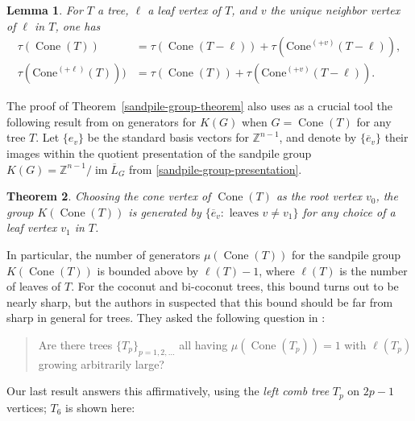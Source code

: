 \documentclass[10pt,reqno]{amsart}
\newcommand{\Z}{\mathbb{Z}}
\DeclareMathOperator{\Cone}{Cone}
\DeclareMathOperator{\im}{im}
\newcommand{\Coneplus}[1]{\mathrm{Cone}^{(+#1)}}
\newtheorem{theorem}{Theorem}[section]
\newtheorem{lemma}[theorem]{Lemma}
\begin{document}
\begin{lemma}\cite[Prop.~3.5 at $y=1$]{Reiner2024SandpileGF}\label{old-theorem-used-as-lemma} For $T$ a tree, $\ell$ a leaf vertex of $T$, and $v$ the unique neighbor vertex of $\ell$ in $T$, one has
\begin{align} 
 \tau(\Cone(T))
&=\tau(\Cone(T -\ell))
 + \tau({\Coneplus{v}(T-\ell)}),\label{thm 1.5-1}\\
\tau(\Coneplus{\ell}(T)))
&=\tau(\Cone(T))
 + \tau(\Coneplus{v}(T-\ell)).\label{thm 1.5-2}
\end{align}
\end{lemma}



The proof of Theorem~\ref{sandpile-group-theorem} also uses as a crucial tool the following result from \cite{Reiner2024SandpileGF} on generators for
$K(G)$ when $G=\Cone(T)$ for any tree $T$. Let $\{e_v\}$ be the standard basis vectors
for $\Z^{n-1}$, and denote by
$\{ \overline{e}_v \}$ their images within
the quotient presentation
of the sandpile group 
$K(G)=\Z^{n-1}/\im \overline{L}_G$
from \eqref{sandpile-group-presentation}.

\begin{theorem}
\label{generators} \cite{Reiner2024SandpileGF} 
Choosing the cone vertex of $\Cone(T)$ as the root 
vertex $v_0$, the group $K(\Cone(T))$
is generated by 
$
\{\overline{e}_v: \text{ leaves }v \neq v_1\}
$
for any choice of a leaf vertex $v_1$ in $T$.
\end{theorem}

In particular, the number of generators $\mu(\Cone(T))$ for the sandpile group $K(\Cone(T))$ is bounded above by $\ell(T)-1$, where $\ell(T)$ is the number of leaves of $T$.  For the coconut and
bi-coconut trees, this bound turns out to be nearly sharp, but the authors in \cite{Reiner2024SandpileGF} suspected that this
bound should be far from sharp in general for trees.  They asked the following question in
\cite[Question 2.2]{Reiner2024SandpileGF}:
\begin{quote}
Are there trees $\{T_p\}_{p=1,2,\ldots}$ all having $\mu(\Cone(T_p))=1$
with $\ell(T_p)$ growing arbitrarily large?
\end{quote}
Our last result answers this affirmatively, using the
{\it left comb tree} $T_p$ on $2p-1$ vertices; $T_6$ is shown here:
\end{document}
